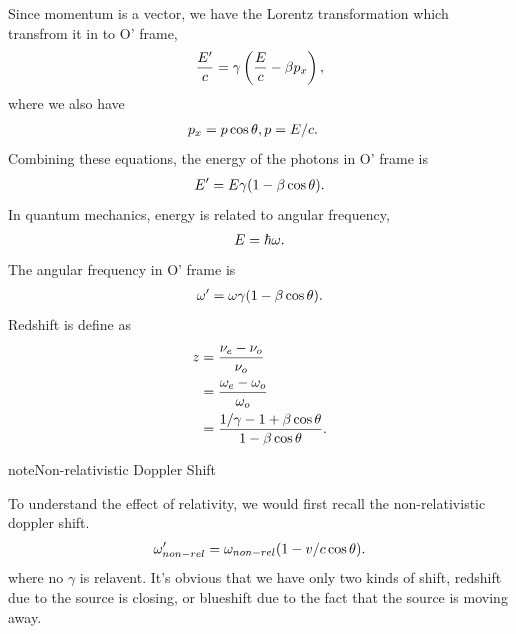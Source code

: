 \documentclass[letterpaper,10pt,english]{sphinxmanual}
\begin{document}
Since momentum is a vector, we have the Lorentz transformation which transfrom it in to O' frame,
\begin{gather}
\begin{split}\frac{E'}{c} = \gamma \left(\frac{E}{c} - \beta p_x\right),\end{split}\notag
\end{gather}
where we also have
\begin{gather}
\begin{split}p_x &= p\cos\theta,
p = E/c.\end{split}\notag
\end{gather}
Combining these equations, the energy of the photons in O' frame is
\begin{gather}
\begin{split}E' = E \gamma (1 - \beta \cos\theta).\end{split}\notag
\end{gather}
In quantum mechanics, energy is related to angular frequency,
\begin{gather}
\begin{split}E = \hbar \omega.\end{split}\notag
\end{gather}
The angular frequency in O' frame is
\begin{gather}
\begin{split}\omega ' = \omega \gamma (1-\beta \cos\theta).\end{split}\notag
\end{gather}
Redshift is define as
\begin{gather}
\begin{split}z &= \frac{\nu_e - \nu_o}{\nu_o} \\
& = \frac{\omega_e - \omega_o}{\omega_o} \\
& = \frac{1/\gamma - 1 + \beta\cos\theta}{1-\beta \cos\theta}.\end{split}\notag
\end{gather}
\begin{notice}{note}{Non-relativistic Doppler Shift}

To understand the effect of relativity, we would first recall the non-relativistic doppler shift.
\begin{gather}
\begin{split}\omega'_{non-rel} = \omega_{non-rel}(1-v/c \cos\theta).\end{split}\notag
\end{gather}
where no \(\gamma\) is relavent. It's obvious that we have only two kinds of shift, redshift due to the source is closing, or blueshift due to the fact that the source is moving away.
\end{notice}
\end{document}

